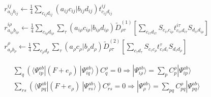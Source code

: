 \documentclass[11pt,pra,aps]{revtex4}
\begin{document}
\begin{align}
  &r^{ij}_{a_{ij}b_{ij}}\leftarrow\frac{1}{4}\sum_{c_{ij}d_{ij}} (a_{ij}c_{ij}|b_{ij}d_{ij}) t^{ij}_{c_{ij}d_{ij}} \\
  &r^{i\rho}_{a_{i\rho}b_{i\rho}}\leftarrow\frac{1}{4}\sum_{c_{i\rho}d_{i\rho}} \sum_\tau (a_{i\rho}c_{i\rho}|b_{i\rho}d_{i\rho}) \tilde{D}^{(1)}_{\rho\tau}\left[\sum_{c_{i\tau}d_{i\tau}}S_{c_{i\tau}c_{i\rho}}t^{i\tau}_{c_{i\tau}d_{i\tau}} S_{d_{i\tau}d_{i\rho}}\right] \\  
  &r^{\rho}_{a_{\rho}b_{\rho}}\leftarrow\frac{1}{4}\sum_{c_{\rho}d_{\rho}} \sum_\tau (a_{\rho}c_{\rho}|b_{\rho}d_{\rho}) \tilde{D}^{(2)}_{\rho\tau}\left[\sum_{c_{\tau}d_{\tau}}S_{c_{\tau}c_{\rho}}t^{\tau}_{c_{\tau}d_{\tau}} S_{d_{\tau}d_{\rho}}\right]
\end{align}

\begin{align}
  &\sum_q \left(\langle\Psi^{ab}_{ip}|(F+e_\rho)\ |\Psi^{ab}_{iq}\rangle\right) C_q^\rho=0\Rightarrow |\Psi_{i\rho}^{ab}\rangle=\sum_{p} C_{p}^{\rho} |\Psi_{ip}^{ab}\rangle \\
  &\sum_{rs} \left(\langle\Psi^{ab}_{pq}|(F+e_\rho)\ |\Psi^{ab}_{rs}\rangle\right) C_{rs}^\rho=0\Rightarrow |\Psi_{\rho}^{ab}\rangle=\sum_{pq} C_{pq}^{\rho} |\Psi_{pq}^{ab}\rangle \\ 
\end{align}
\end{document}
